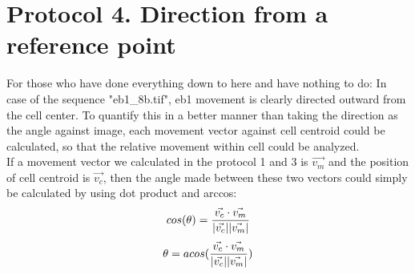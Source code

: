 \documentclass[11pnt]{article}
\begin{document}
\section{Protocol 4. Direction from a reference point}

For those who have done everything down to here and have nothing to do: In case of the sequence "eb1\_8b.tif", eb1 movement is clearly directed outward from the cell center. To quantify this in a better manner than taking the direction as the angle against image, each movement vector against cell centroid could be calculated, so that the relative movement within cell could be analyzed. 
\\
If a movement vector we calculated in the protocol 1 and 3 is \(\vec{v_{m}}\) and the position of cell centroid is \(\vec{v_c}\), then the angle made between these two vectors could simply be calculated by using dot product and arccos:
\[
cos(\theta) = \frac{\vec{v_c} \cdot \vec{v_m}}{|\vec{v_c}||\vec{v_m}|}\\
\]
\[
\theta = acos(\frac{\vec{v_c} \cdot \vec{v_m}}{|\vec{v_c}||\vec{v_m}|})\\
\]
\end{document}
